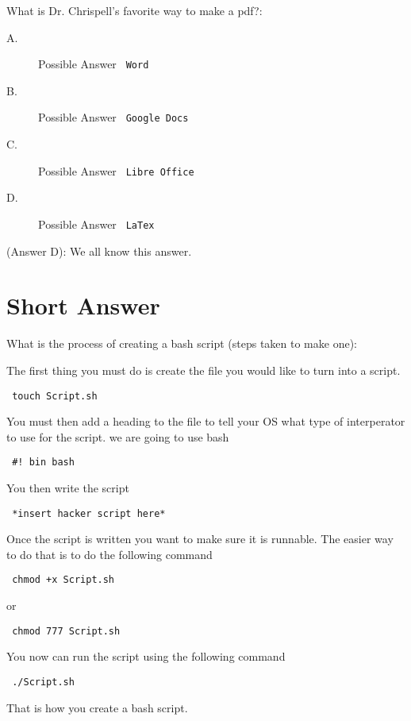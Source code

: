 \documentclass[12pt,answers]{exam}
\begin{document}
\begin{questions}
\question What is Dr. Chrispell's favorite way to make a pdf?:
\begin{description}
\item[A.] Possible Answer \verb' Word'
\item[B.] Possible Answer \verb' Google Docs'
\item[C.] Possible Answer \verb' Libre Office'   
\item[D.] Possible Answer \verb' LaTex'     
\end{description}
\begin{solution}
(Answer D): We all know this answer.   
\end{solution}

\end{questions}
\section*{Short Answer}
What is the process of creating a bash script (steps taken to make one):
\begin{solution}
The first thing you must do is create the file you would like to turn into a script.

\verb' touch Script.sh'

You must then add a heading to the file to tell your OS what type of interperator to use for the script. we are going to use bash

\verb' #! bin bash' 

You then write the script

\verb' *insert hacker script here*'

Once the script is written you want to make sure it is runnable. The easier way to do that is to do the following command 

\verb' chmod +x Script.sh'

or

\verb' chmod 777 Script.sh' 

You now can run the script using the following command 

\verb' ./Script.sh' 

That is how you create a bash script. 
\end{solution}
\end{document}
